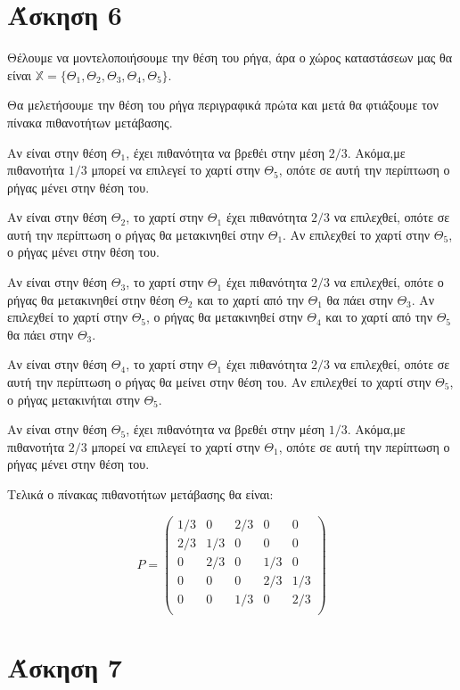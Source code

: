 \documentclass{article}
\begin{document}
\section*{Άσκηση 6}

Θέλουμε να μοντελοποιήσουμε την θέση του ρήγα, άρα ο χώρος καταστάσεων μας θα είναι $\mathbb{X} = \{Θ_1, Θ_2, Θ_3, Θ_4, Θ_5\}$.

Θα μελετήσουμε την θέση του ρήγα περιγραφικά πρώτα και μετά θα φτιάξουμε τον πίνακα πιθανοτήτων μετάβασης.

Αν είναι στην θέση $Θ_1$, έχει πιθανότητα να βρεθέι στην μέση $2/3$. Ακόμα,με πιθανοτήτα $1/3$ μπορεί να επιλεγεί το χαρτί στην $Θ_5$, οπότε σε αυτή την περίπτωση ο ρήγας μένει στην θέση του.

Αν είναι στην θέση $Θ_2$, το χαρτί στην $Θ_1$ έχει πιθανότητα $2/3$ να επιλεχθεί, οπότε σε αυτή την περίπτωση ο ρήγας θα μετακινηθεί στην $Θ_1$. Αν επιλεχθεί το χαρτί στην $Θ_5$, ο ρήγας μένει στην θέση του.

Αν είναι στην θέση $Θ_3$, το χαρτί στην $Θ_1$ έχει πιθανότητα $2/3$ να επιλεχθεί, οπότε ο ρήγας θα μετακινηθεί στην θέση $Θ_2$ και το χαρτί από την $Θ_1$ θα πάει στην $Θ_3$.  Αν επιλεχθεί το χαρτί στην $Θ_5$, ο ρήγας θα μετακινηθεί στην $Θ_4$ και το χαρτί από την $Θ_5$ θα πάει στην $Θ_3$.

Αν είναι στην θέση $Θ_4$, το χαρτί στην $Θ_1$ έχει πιθανότητα $2/3$ να επιλεχθεί, οπότε σε αυτή την περίπτωση ο ρήγας θα μείνει στην θέση του. Αν επιλεχθεί το χαρτί στην $Θ_5$, ο ρήγας μετακινήται στην $Θ_5$.

Αν είναι στην θέση $Θ_5$, έχει πιθανότητα να βρεθέι στην μέση $1/3$. Ακόμα,με πιθανοτήτα $2/3$ μπορεί να επιλεγεί το χαρτί στην $Θ_1$, οπότε σε αυτή την περίπτωση ο ρήγας μένει στην θέση του.

Τελικά ο πίνακας πιθανοτήτων μετάβασης θα είναι:

\begin{equation*}
    P = 
    \begin{pmatrix}
        1/3 & 0 & 2/3 & 0 & 0\\
       2/3 & 1/3 & 0 & 0 & 0\\
        0 & 2/3 & 0 & 1/3 & 0\\
        0 & 0 & 0 & 2/3 & 1/3\\
        0 & 0 & 1/3 & 0 & 2/3\\
    \end{pmatrix}
\end{equation*}

\section*{Άσκηση 7}
\end{document}
